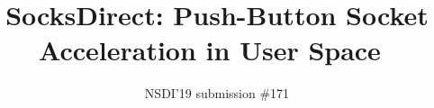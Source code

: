 \documentclass[twocolumn,10pt]{article}
\begin{document}
\pagestyle{plain} %

\date{}

\title{SocksDirect: Push-Button Socket Acceleration in User Space~\vspace{-0.1in}}

\author{{\rm NSDI'19 submission \#171}\vspace{-0.5in}}

\maketitle

\newcommand{\specialcell}[2][c]{%
  \begin{tabular}[#1]{@{}c@{}}#2\end{tabular}}





%









\small 
\balance


\end{document}
